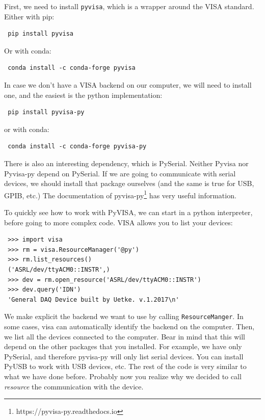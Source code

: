 First, we need to install \texttt{pyvisa}, which is a wrapper around the VISA standard. Either with pip:

\begin{verbatim}
 pip install pyvisa
\end{verbatim}

Or with conda:

\begin{verbatim}
 conda install -c conda-forge pyvisa
\end{verbatim}

In case we don't have a VISA backend on our computer, we will need to install one, and the easiest is the python implementation:

\begin{verbatim}
 pip install pyvisa-py
\end{verbatim}

or with conda:

\begin{verbatim}
 conda install -c conda-forge pyvisa-py
\end{verbatim}

There is also an interesting dependency, which is PySerial. Neither Pyvisa nor Pyvisa-py depend on PySerial. If we are going to communicate with serial devices, we should install that package ourselves (and the same is true for USB, GPIB, etc.) The documentation of pyvisa-py\footnote{https://pyvisa-py.readthedocs.io} has very useful information. 

To quickly see how to work with PyVISA, we can start in a python interpreter, before going to more complex code. VISA allows you to list your devices:

\begin{verbatim}
 >>> import visa
 >>> rm = visa.ResourceManager('@py')
 >>> rm.list_resources()
 ('ASRL/dev/ttyACM0::INSTR',)
 >>> dev = rm.open_resource('ASRL/dev/ttyACM0::INSTR')
 >>> dev.query('IDN')
 'General DAQ Device built by Uetke. v.1.2017\n'
\end{verbatim}

We make explicit the backend we want to use by calling \texttt{ResourceManger}. In some cases, visa can automatically identify the backend on the computer. Then, we list all the devices connected to the computer. Bear in mind that this will depend on the other packages that you installed. For example, we have only PySerial, and therefore pyvisa-py will only list serial devices. You can install PyUSB to work with USB devices, etc. The rest of the code is very similar to what we have done before. Probably now you realize why we decided to call \emph{resource} the communication with the device. 

